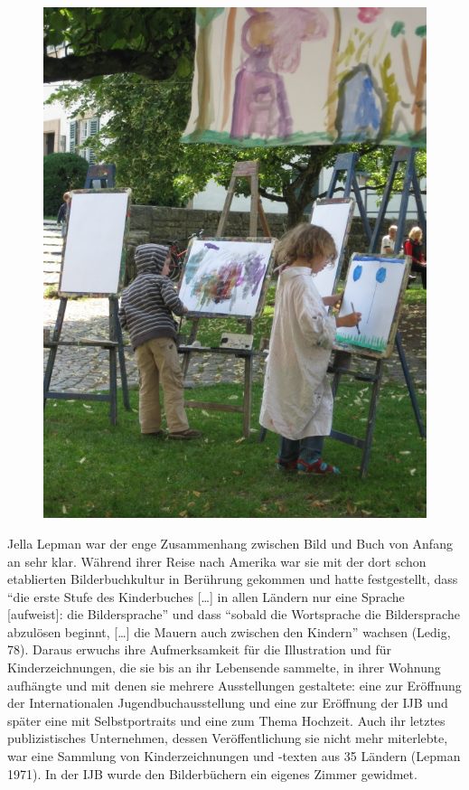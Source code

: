 \documentclass[a4paper,
fontsize=11pt,
oneside,
numbers=noperiodatend,
parskip=half-,
bibliography=totoc,
final
]{scrartcl}
\begin{document}
\begin{figure}[htbp]
\centering
\includegraphics{img/bild11.jpg}
\end{figure}

Jella Lepman war der enge Zusammenhang zwischen Bild und Buch von Anfang
an sehr klar. Während ihrer Reise nach Amerika war sie mit der dort
schon etablierten Bilderbuchkultur in Berührung gekommen und hatte
festgestellt, dass \enquote{die erste Stufe des Kinderbuches
{[}\ldots{}{]} in allen Ländern nur eine Sprache {[}aufweist{]}: die
Bildersprache} und dass \enquote{sobald die Wortsprache die
Bildersprache abzulösen beginnt, {[}\ldots{}{]} die Mauern auch zwischen
den Kindern} wachsen (Ledig, 78). Daraus erwuchs ihre Aufmerksamkeit für
die Illustration und für Kinderzeichnungen, die sie bis an ihr
Lebensende sammelte, in ihrer Wohnung aufhängte und mit denen sie
mehrere Ausstellungen gestaltete: eine zur Eröffnung der Internationalen
Jugendbuchausstellung und eine zur Eröffnung der IJB und später eine mit
Selbstportraits und eine zum Thema Hochzeit. Auch ihr letztes
publizistisches Unternehmen, dessen Veröffentlichung sie nicht mehr
miterlebte, war eine Sammlung von Kinderzeichnungen und -texten aus 35
Ländern (Lepman 1971). In der IJB wurde den Bilderbüchern ein eigenes
Zimmer gewidmet.~
\end{document}
